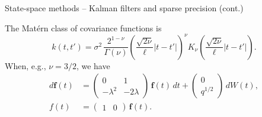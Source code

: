 \documentclass[first=dgreen,second=purple,presentation]{elecslides}
\begin{document}
\begin{frame}{State-space methods -- Kalman filters and sparse precision (cont.)}
  \begin{example}
        The Mat\'ern class of covariance functions is
\begin{equation*}
k(t,t') = \sigma^2 \,\frac{2^{1-\nu}}{\Gamma(\nu)}
\left(\frac{\sqrt{2\nu}}{\ell} |t-t'| \right)^{\nu} K_{\nu}
\left(\frac{\sqrt{2\nu}}{\ell}  |t-t'| \right).
\end{equation*}
        When, e.g., $\nu = 3/2$, we have
\begin{equation*}
\begin{split}
d\mathbf{f}(t) &= 
\begin{pmatrix} 
0 & 1 \\
-\lambda^2 & -2\lambda
\end{pmatrix} \,\mathbf{f}(t) \, dt
+ 
\begin{pmatrix}
0\\
q^{1/2}
\end{pmatrix}\,dW(t), \\
f(t) &= \begin{pmatrix} 1 & 0 \end{pmatrix} \, \mathbf{f}(t).
\end{split}
\end{equation*} 
   \end{example}
\end{frame}
\end{document}

